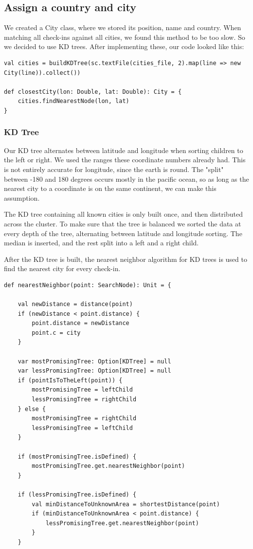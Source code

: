 \documentclass[abstract=on]{article}
\begin{document}
\subsection{Assign a country and city}
We created a City class, where we stored its position, name and country.
When matching all check-ins against all cities, we found this method to be too
slow. So we decided to use KD trees. After implementing these, our code looked
like this:
\begin{lstlisting}
val cities = buildKDTree(sc.textFile(cities_file, 2).map(line => new City(line)).collect())

def closestCity(lon: Double, lat: Double): City = {
    cities.findNearestNode(lon, lat)
}
\end{lstlisting}

\subsubsection{KD Tree}
Our KD tree alternates between latitude and longitude when sorting
children to the left or right. We used the ranges these coordinate numbers
already had. This is not entirely accurate for longitude, since the earth is
round. The "split" between -180 and 180 degrees occurs mostly in the pacific
ocean, so as long as the nearest city to a coordinate is on the same continent,
we can make this assumption.

The KD tree containing all known cities is only built once, and then distributed
across the cluster. To make sure that the tree is balanced we sorted the data
at every depth of the tree, alternating between latitude and longitude sorting.
 The median is inserted, and the rest split into
a left and a right child.

After the KD tree is built, the nearest neighbor algorithm for KD trees is used
to find the nearest city for every check-in.
\begin{lstlisting}
def nearestNeighbor(point: SearchNode): Unit = {

    val newDistance = distance(point)
    if (newDistance < point.distance) {
        point.distance = newDistance
        point.c = city
    }

    var mostPromisingTree: Option[KDTree] = null
    var lessPromisingTree: Option[KDTree] = null
    if (pointIsToTheLeft(point)) {
        mostPromisingTree = leftChild
        lessPromisingTree = rightChild
    } else {
        mostPromisingTree = rightChild
        lessPromisingTree = leftChild
    }

    if (mostPromisingTree.isDefined) {
        mostPromisingTree.get.nearestNeighbor(point)
    }

    if (lessPromisingTree.isDefined) {
        val minDistanceToUnknownArea = shortestDistance(point)
        if (minDistanceToUnknownArea < point.distance) {
            lessPromisingTree.get.nearestNeighbor(point)
        }
    }
\end{lstlisting}
\end{document}
